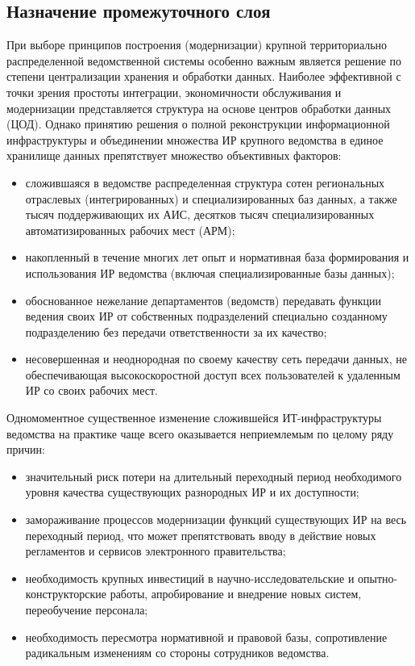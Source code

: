 \begin{multicols}{2}
\subsection{Назначение промежуточного слоя}

      При выборе принципов построения (модернизации) крупной 
      тер\-ри\-то\-ри\-аль\-но рас\-пре\-де\-лен\-ной ведомственной системы особенно важным является решение по степени 
централизации хранения и обработки данных. Наиболее эффективной с точки зрения простоты 
интеграции, эко\-но\-мич\-ности обслуживания и модернизации представляется структура на 
основе центров обработки данных (ЦОД). Однако принятию решения о полной реконструкции 
информационной инфраструктуры и объединении множества ИР 
крупного ведомства в единое хранилище данных препятствует множество объективных 
факторов:
      \begin{itemize}
\item сложившаяся в ведомстве распределенная структура сотен региональных отраслевых 
(интегрированных) и специализированных баз данных, а также тысяч поддерживающих их 
АИС, десятков тысяч 
специализированных автоматизированных рабочих мест (АРМ);
\item накопленный в течение многих лет опыт и нормативная база формирования и 
использования ИР ведомства (включая специализированные базы данных);
\item обоснованное нежелание департаментов (ведомств) передавать функции ведения 
своих ИР от собственных подразделений специально созданному 
подразделению без передачи ответственности за их качество;
\item несовершенная и неоднородная по своему качеству сеть передачи данных, не 
обес\-пе\-чи\-ва\-ющая высокоскоростной доступ всех пользователей к удаленным 
ИР со своих рабочих мест.
\end{itemize}

      Одномоментное существенное изменение сложившейся ИТ-ин\-фра\-струк\-ту\-ры ведомства 
на практике чаще всего оказывается неприемлемым по целому ряду причин:
      \begin{itemize}
\item значительный риск потери на длительный переходный период необходимого уровня 
качества существующих разнородных ИР и их до\-ступ\-ности;
\item замораживание процессов модернизации функций существующих ИР на весь 
переходный период, что может препятствовать вводу в действие новых регламентов и 
сервисов электронного правительства;
\item необходимость крупных инвестиций в на\-уч\-но-ис\-сле\-до\-ва\-тель\-ские и опыт\-но-кон\-ст\-рук\-тор\-ские
работы, апробирование и внедрение новых сис\-тем, переобучение персонала;
\item необходимость пересмотра нормативной и правовой базы, сопротивление 
радикальным изменениям со стороны сотрудников ведомства.
\end{itemize}
      

\end{multicols}
